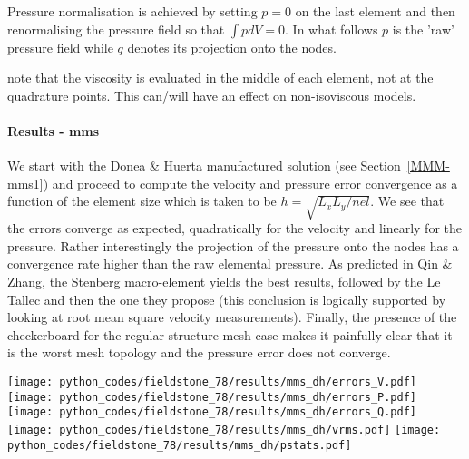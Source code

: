 Pressure normalisation is achieved by setting $p=0$ on the last element and then 
renormalising the pressure field so that $\int p dV=0$. In what follows $p$ is the 'raw' pressure
field while $q$ denotes its projection onto the nodes. 





{\color{red} note that the viscosity is evaluated in the middle of each element, not 
at the quadrature points. This can/will have an effect on non-isoviscous models.}


\paragraph{Results - mms}

We start with the Donea \& Huerta manufactured solution (see Section~\ref{MMM-mms1}) and 
proceed to compute the velocity and pressure error convergence as a function of the 
element size which is taken to be $h = \sqrt{L_xL_y/nel}$. We see that 
the errors converge as expected, quadratically for the velocity and linearly for the pressure.
Rather interestingly the projection of the pressure onto the nodes has a convergence rate 
higher than the raw elemental pressure. As predicted in Qin \& Zhang, the Stenberg macro-element 
yields the best results, followed by the Le Tallec and then the one they propose (this conclusion 
is logically supported by looking at root mean square velocity measurements). 
Finally, the presence of the checkerboard for the regular structure mesh case
makes it painfully clear that it is the worst mesh topology 
and the pressure error does not converge.  

\begin{center}
\texttt{[image: python\_codes/fieldstone\_78/results/mms\_dh/errors\_V.pdf]}
\texttt{[image: python\_codes/fieldstone\_78/results/mms\_dh/errors\_P.pdf]}
\texttt{[image: python\_codes/fieldstone\_78/results/mms\_dh/errors\_Q.pdf]}\\
\texttt{[image: python\_codes/fieldstone\_78/results/mms\_dh/vrms.pdf]}
\texttt{[image: python\_codes/fieldstone\_78/results/mms\_dh/pstats.pdf]}
\end{center}

